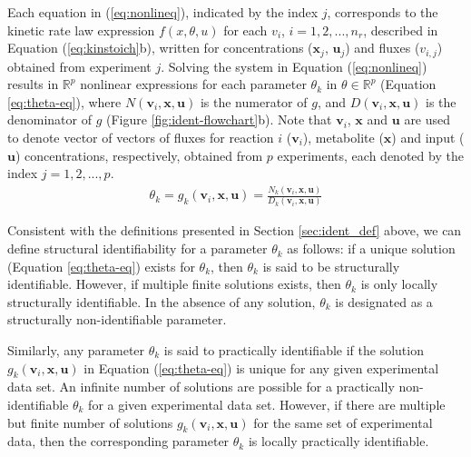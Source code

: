 \documentclass[10pt]{article}
\begin{document}
	Each equation in (\ref{eq:nonlineq}), indicated by the index $j$, corresponds to the kinetic rate law expression $f(x, \theta, u)$ for each $v_i$, $i={1, 2, ..., n_r}$, described in Equation (\ref{eq:kinstoich}b), written for concentrations ($\mathbf{x}_j$, $\mathbf{u}_j$) and fluxes ($v_{i,j}$) obtained from experiment $j$. Solving the system in Equation (\ref{eq:nonlineq}) results in $\mathbb{R}^{p}$ nonlinear expressions for each parameter $\theta_k$ in $\theta \in \mathbb{R}^{p}$ (Equation \ref{eq:theta-eq}), where $N(\mathbf{v}_i, \mathbf{x}, \mathbf{u})$ is the numerator of $g$, and $D(\mathbf{v}_i, \mathbf{x}, \mathbf{u})$ is the denominator of $g$ (Figure \ref{fig:ident-flowchart}b). Note that $\mathbf{v}_i$, $\mathbf{x}$ and $\mathbf{u}$ are used to denote vector of vectors of fluxes for reaction $i$ ($\mathbf{v}_i$), metabolite ($\mathbf{x}$) and input ($\mathbf{u}$) concentrations, respectively, obtained from $p$ experiments, each denoted by the index $j = {1, 2, ..., p}$.
	\begin{align}\label{eq:theta-eq}
	\theta_k = g_k(\mathbf{v}_i, \mathbf{x}, \mathbf{u}) = \frac{N_k(\mathbf{v}_i, \mathbf{x}, \mathbf{u})}{D_k(\mathbf{v}_i, \mathbf{x}, \mathbf{u})}
	\end{align}
	
	Consistent with the definitions presented in Section \ref{sec:ident_def} above, we can define structural identifiability for a parameter $\theta_k$ as follows: if a unique solution (Equation \ref{eq:theta-eq}) exists for $\theta_k$, then $\theta_k$ is said to be structurally identifiable. However, if multiple finite solutions exists, then $\theta_k$ is only locally structurally identifiable. In the absence of any solution, $\theta_k$ is designated as a structurally non-identifiable parameter. 
	
	Similarly, any parameter $\theta_k$ is said to practically identifiable if the solution $g_k(\mathbf{v}_i, \mathbf{x}, \mathbf{u})$ in Equation (\ref{eq:theta-eq}) is unique for any given experimental data set. An infinite number of solutions are possible for a practically non-identifiable $\theta_k$ for a given experimental data set. However, if there are multiple but finite number of solutions $g_k(\mathbf{v}_i, \mathbf{x}, \mathbf{u})$ for the same set of experimental data, then the corresponding parameter $\theta_k$ is locally practically identifiable. 	
	
\end{document}
